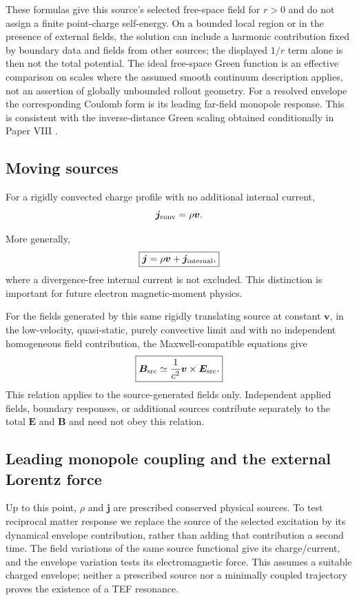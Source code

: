 \documentclass[11pt]{article}
\begin{document}
These formulas give this source's selected free-space field for $r>0$ and do not assign a finite point-charge self-energy. On a bounded local region or in the presence of external fields, the solution can include a harmonic contribution fixed by boundary data and fields from other sources; the displayed $1/r$ term alone is then not the total potential. The ideal free-space Green function is an effective comparison on scales where the assumed smooth continuum description applies, not an assertion of globally unbounded rollout geometry. For a resolved envelope the corresponding Coulomb form is its leading far-field monopole response. This is consistent with the inverse-distance Green scaling obtained conditionally in Paper VIII \cite{wu2026geometry}.

\subsection{Moving sources}

For a rigidly convected charge profile with no additional internal current,
\begin{equation}
\bm j_{\rm conv}
=
\rho\bm v.
\end{equation}

More generally,
\begin{equation}
\boxed{
\bm j
=
\rho\bm v
+
\bm j_{\rm internal},
}
\end{equation}
where a divergence-free internal current is not excluded. This distinction is important for future electron magnetic-moment physics.

For the fields generated by this same rigidly translating source at constant $\bm v$, in the low-velocity, quasi-static, purely convective limit and with no independent homogeneous field contribution, the Maxwell-compatible equations give
\begin{equation}
\boxed{
\bm B_{\rm src}
\simeq
\frac{1}{c^2}
\bm v\times\bm E_{\rm src}.
}
\end{equation}
This relation applies to the source-generated fields only. Independent applied fields, boundary responses, or additional sources contribute separately to the total $\bm E$ and $\bm B$ and need not obey this relation.


\subsection{Leading monopole coupling and the external Lorentz force}

Up to this point, $\rho$ and $\mathbf j$ are prescribed conserved physical sources. To test reciprocal matter response we replace the source of the selected excitation by its dynamical envelope contribution, rather than adding that contribution a second time. The field variations of the same source functional give its charge/current, and the envelope variation tests its electromagnetic force. This assumes a suitable charged envelope; neither a prescribed source nor a minimally coupled trajectory proves the existence of a TEF resonance.
\end{document}
